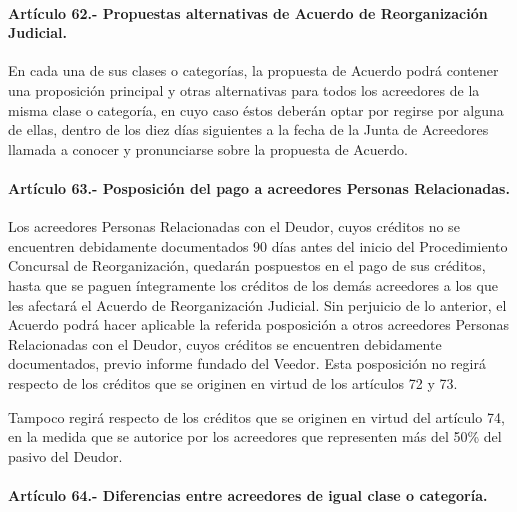 \documentclass[
]{book}
\begin{document}
\hypertarget{artuxedculo-62.--propuestas-alternativas-de-acuerdo-de-reorganizaciuxf3n-judicial.}{%
\paragraph*{Artículo 62.- Propuestas alternativas de Acuerdo de Reorganización Judicial.}\label{artuxedculo-62.--propuestas-alternativas-de-acuerdo-de-reorganizaciuxf3n-judicial.}}

En cada una de sus clases o categorías, la propuesta de Acuerdo podrá contener una proposición principal y otras alternativas para todos los acreedores de la misma clase o categoría, en cuyo caso éstos deberán optar por regirse por alguna de ellas, dentro de los diez días siguientes a la fecha de la Junta de Acreedores llamada a conocer y pronunciarse sobre la propuesta de Acuerdo.

\hypertarget{artuxedculo-63.--posposiciuxf3n-del-pago-a-acreedores-personas-relacionadas.}{%
\paragraph*{Artículo 63.- Posposición del pago a acreedores Personas Relacionadas.}\label{artuxedculo-63.--posposiciuxf3n-del-pago-a-acreedores-personas-relacionadas.}}

Los acreedores Personas Relacionadas con el Deudor, cuyos créditos no se encuentren debidamente documentados 90 días antes del inicio del Procedimiento Concursal de Reorganización, quedarán pospuestos en el pago de sus créditos, hasta que se paguen íntegramente los créditos de los demás acreedores a los que les afectará el Acuerdo de Reorganización Judicial. Sin perjuicio de lo anterior, el Acuerdo podrá hacer aplicable la referida posposición a otros acreedores Personas Relacionadas con el Deudor, cuyos créditos se encuentren debidamente documentados, previo informe fundado del Veedor. Esta posposición no regirá respecto de los créditos que se originen en virtud de los artículos 72 y 73.

Tampoco regirá respecto de los créditos que se originen en virtud del artículo 74, en la medida que se autorice por los acreedores que representen más del 50\% del pasivo del Deudor.

\hypertarget{artuxedculo-64.--diferencias-entre-acreedores-de-igual-clase-o-categoruxeda.}{%
\paragraph*{Artículo 64.- Diferencias entre acreedores de igual clase o categoría.}\label{artuxedculo-64.--diferencias-entre-acreedores-de-igual-clase-o-categoruxeda.}}
\end{document}
